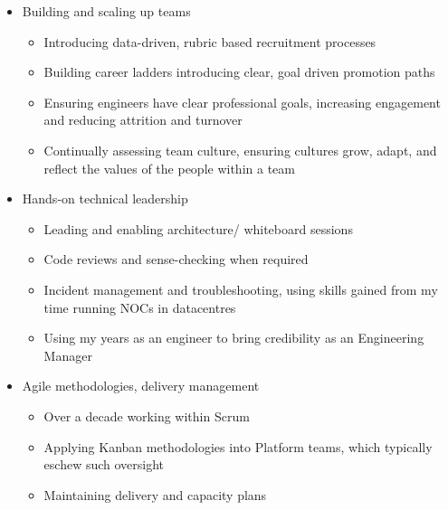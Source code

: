 \documentclass[11pt,a4paper,sans]{article}
\begin{document}
\begin{itemize}
\item Building and scaling up teams
  \begin{itemize}
  \item Introducing data-driven, rubric based recruitment processes
  \item Building career ladders introducing clear, goal driven promotion paths
  \item Ensuring engineers have clear professional goals, increasing engagement and reducing attrition and turnover
  \item Continually assessing team culture, ensuring cultures grow, adapt, and reflect the values of the people within a team
  \end{itemize}
\item Hands-on technical leadership
  \begin{itemize}
  \item Leading and enabling architecture/ whiteboard sessions
  \item Code reviews and sense-checking when required
  \item Incident management and troubleshooting, using skills gained from my time running NOCs in datacentres
  \item Using my years as an engineer to bring credibility as an Engineering Manager
  \end{itemize}
\item Agile methodologies, delivery management
  \begin{itemize}
  \item Over a decade working within Scrum
  \item Applying Kanban methodologies into Platform teams, which typically eschew such oversight
  \item Maintaining delivery and capacity plans
  \end{itemize}
\end{itemize}





\end{document}
